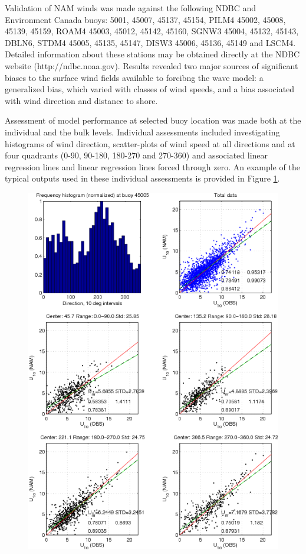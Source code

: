 Validation of NAM winds was made against the following NDBC and Environment
Canada
buoys: 5001, 45007, 45137, 45154,
PILM4 45002, 45008, 45139, 45159, ROAM4 45003, 45012, 45142, 45160, SGNW3 45004,
45132, 45143, DBLN6, STDM4 45005, 45135, 45147, DISW3 45006, 45136, 45149 and
LSCM4. Detailed information about these stations may be obtained directly at the
NDBC website (http://ndbc.noaa.gov). Results revealed two major 
sources of significant biases to the surface wind
fields available to forcibng the wave model: a generalized bias, 
which varied with classes of wind speeds, and a bias associated with
wind direction and distance to shore.

Assessment of model performance at selected buoy location was made both at the
individual and the bulk levels. Individual assessments included investigating
histograms of wind direction, scatter-plots of wind speed at all directions and
at four quadrants (0-90, 90-180, 180-270 and 270-360) and associated linear
regression lines and linear regression lines forced through zero. An example of
the typical outputs used in these individual assessments is provided in Figure
\ref{fig:4q45005}.

\begin{figure}[h!]
 \centering
 \includegraphics{./figures/fig_45005_4q.png}
 \label{fig:4q45005}
\end{figure}
 
